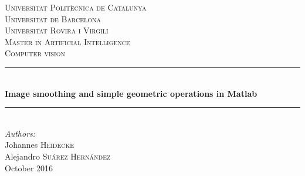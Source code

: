 \begin{titlepage}

\vspace*{\fill}

\newcommand{\HRule}{\rule{\linewidth}{0.5mm}} %

\center %
 

\textsc{\LARGE Universitat Politècnica de Catalunya}\\[0.5cm] %
\textsc{\LARGE Universitat de Barcelona}\\[0.5cm] %
\textsc{\LARGE Universitat Rovira i Virgili}\\[1.5cm] %
\textsc{\Large Master in Artificial Intelligence}\\[0.5cm] %
\textsc{\large Computer vision}\\[0.5cm] %


\HRule \\[0.4cm]
{ \huge \bfseries Image smoothing and simple geometric operations in Matlab}\\[0.4cm] %
\HRule \\[1.5cm]
 

\Large \emph{Authors:}\\
Johannes \textsc{Heidecke}\\
Alejandro \textsc{Suárez Hernández}\\[3cm]


{\large October 2016}\\[3cm] %

\vspace*{\fill} %

\end{titlepage}
